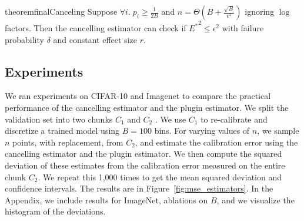 \begin{restatable}{theorem}{finalCanceling}
\label{thm:final-ours}
Suppose $\forall i.\;p_i \geq \frac{1}{2B}$ and $n = \Theta(B+\frac{\sqrt{B}}{\epsilon^2})$ ignoring $\log$ factors. Then the cancelling estimator can check if ${E^*}^2 \leq \epsilon^2$ with failure probability $\delta$ and constant effect size $r$. 
\end{restatable}


\subsection{Experiments}

We ran experiments on CIFAR-10 and Imagenet to compare the practical performance of the cancelling estimator and the plugin estimator. We split the validation set  into two chunks $C_1$  and $C_2$ . We use $C_1$ to re-calibrate and discretize a trained model using $B = 100$ bins. For varying values of $n$, we sample $n$ points, with replacement, from $C_2$, and estimate the calibration error using the cancelling estimator and the plugin estimator. We then compute the squared deviation of these estimates from the calibration error measured on the entire chunk $C_2$. We repeat this 1,000 times to get the mean squared deviation and confidence intervals. The results are in Figure~\ref{fig:mse_estimators}. 
In the Appendix, we include results for ImageNet, ablations on $B$, and we visualize the histogram of the deviations.

